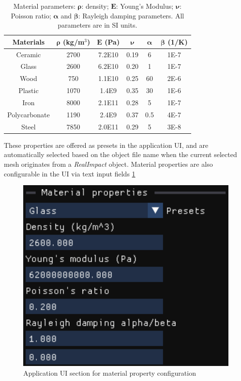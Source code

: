 \documentclass[12pt]{article}
\begin{document}
\begin{table}[ht]
  \centering
  \caption{Material parameters: $\boldsymbol{\rho}$:
  density; $\boldsymbol{E}$: Young’s Modulus; $\boldsymbol{\nu}$: Poisson ratio; $\boldsymbol{\alpha}$ and $\boldsymbol{\beta}$: Rayleigh
  damping parameters. All parameters are in SI units.}
  \label{tab:MaterialProperties}
  \begin{tabular}{|c|c|c|c|c|c|}
  \hline
  \textbf{Materials} & $\boldsymbol{\rho}$ (kg/m$^3$) & $\boldsymbol{E}$ (Pa) & $\boldsymbol{\nu}$ & $\boldsymbol{\alpha}$ & $\boldsymbol{\beta}$ (1/K) \\
  \hline
  Ceramic       & 2700 & 7.2E10 & 0.19 & 6   & 1E-7 \\
  Glass         & 2600 & 6.2E10 & 0.20 & 1   & 1E-7 \\
  Wood          & 750  & 1.1E10 & 0.25 & 60  & 2E-6 \\
  Plastic       & 1070 & 1.4E9  & 0.35 & 30  & 1E-6 \\
  Iron          & 8000 & 2.1E11 & 0.28 & 5   & 1E-7 \\
  Polycarbonate & 1190 & 2.4E9  & 0.37 & 0.5 & 4E-7 \\
  Steel         & 7850 & 2.0E11 & 0.29 & 5   & 3E-8 \\
  \hline
  \end{tabular}
\end{table}

These properties are offered as presets in the application UI, and are automatically selected based on the object file name when the current selected mesh originates from a \textit{RealImpact} object.
Material properties are also configurable in the UI via text input fields \ref{fig:MaterialProperties}

\begin{figure}
  \centering
  \includegraphics[width=0.5\linewidth]{images/MaterialProperties.png}
  \caption{Application UI section for material property configuration}
  \label{fig:MaterialProperties}
\end{figure}
\end{document}
